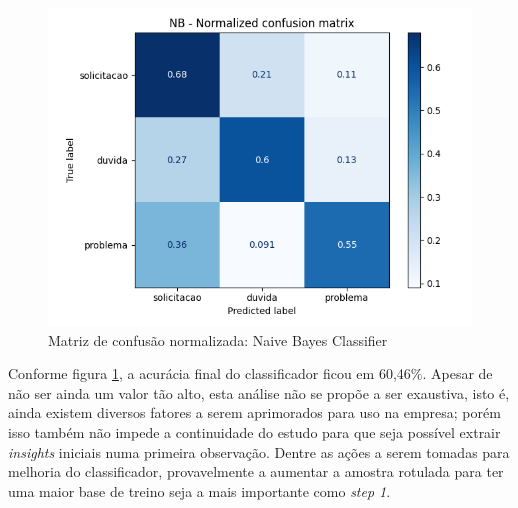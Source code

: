 \documentclass[twocolumn]{rbef}
\newcommand{\1}{\mathbbm{1}}
\begin{document}
\begin{figure}[!htb]
  \centering \includegraphics[scale=0.5]{7. Matriz_confusao_NB_normalizada.png}
  \caption{Matriz de confusão normalizada: Naive Bayes Classifier}
  \label{fig7}
\end{figure}
\newline\linebreak Conforme figura \ref{fig7}, a acurácia final do classificador ficou em 60,46\%. Apesar de não ser ainda um valor tão alto, esta análise não se propõe a ser exaustiva, isto é, ainda existem diversos fatores a serem aprimorados para uso na empresa; porém isso também não impede a continuidade do estudo para que seja possível extrair \emph{insights} iniciais numa primeira observação. Dentre as ações a serem tomadas para melhoria do classificador, provavelmente a aumentar a amostra rotulada para ter uma maior base de treino seja a mais importante como \emph{step 1}.
\end{document}
